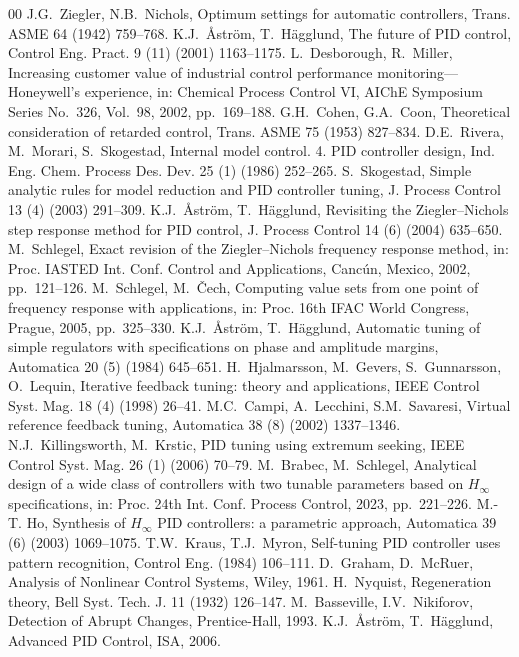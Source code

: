 \documentclass[final,3p,times,twocolumn]{elsarticle}
\begin{document}

\begingroup\scriptsize
\begin{thebibliography}{00}
\setlength{\itemsep}{-0.6pt}\setlength{\parsep}{0pt}
 J.G.~Ziegler, N.B.~Nichols, Optimum settings for
automatic controllers, Trans. ASME 64 (1942) 759--768.
 K.J.~\r{A}str\"om, T.~H\"agglund, The future
of PID control, Control Eng. Pract. 9 (11) (2001) 1163--1175.
 L.~Desborough, R.~Miller, Increasing
customer value of industrial control performance
monitoring---Honeywell's experience, in: Chemical Process Control VI,
AIChE Symposium Series No.~326, Vol.~98, 2002, pp.~169--188.
 G.H.~Cohen, G.A.~Coon, Theoretical consideration
of retarded control, Trans. ASME 75 (1953) 827--834.
 D.E.~Rivera, M.~Morari, S.~Skogestad, Internal
model control. 4. PID controller design, Ind. Eng. Chem. Process Des.
Dev. 25 (1) (1986) 252--265.
 S.~Skogestad, Simple analytic rules for model
reduction and PID controller tuning, J. Process Control 13 (4) (2003)
291--309.
 K.J.~\r{A}str\"om, T.~H\"agglund,
Revisiting the Ziegler--Nichols step response method for PID control,
J. Process Control 14 (6) (2004) 635--650.
 M.~Schlegel, Exact revision of the
Ziegler--Nichols frequency response method, in: Proc. IASTED Int. Conf.
Control and Applications, Canc\'un, Mexico, 2002, pp.~121--126.
 M.~Schlegel, M.~\v{C}ech, Computing value
sets from one point of frequency response with applications, in: Proc.
16th IFAC World Congress, Prague, 2005, pp.~325--330.
 K.J.~\r{A}str\"om, T.~H\"agglund, Automatic
tuning of simple regulators with specifications on phase and amplitude
margins, Automatica 20 (5) (1984) 645--651.
 H.~Hjalmarsson, M.~Gevers, S.~Gunnarsson,
O.~Lequin, Iterative feedback tuning: theory and applications, IEEE
Control Syst. Mag. 18 (4) (1998) 26--41.
 M.C.~Campi, A.~Lecchini, S.M.~Savaresi, Virtual
reference feedback tuning, Automatica 38 (8) (2002) 1337--1346.
 N.J.~Killingsworth, M.~Krstic, PID tuning
using extremum seeking, IEEE Control Syst. Mag. 26 (1) (2006) 70--79.
 M.~Brabec, M.~Schlegel, Analytical design of a
wide class of controllers with two tunable parameters based on $H_\infty$
specifications, in: Proc. 24th Int. Conf. Process Control, 2023, pp.~221--226.
 M.-T. Ho, Synthesis of $H_\infty$ PID controllers: a
parametric approach, Automatica 39 (6) (2003) 1069--1075.
 T.W.~Kraus, T.J.~Myron, Self-tuning PID
controller uses pattern recognition, Control Eng. (1984) 106--111.
 D.~Graham, D.~McRuer, Analysis of
Nonlinear Control Systems, Wiley, 1961.
 H.~Nyquist, Regeneration theory, Bell Syst.
Tech. J. 11 (1932) 126--147.
 M.~Basseville, I.V.~Nikiforov,
Detection of Abrupt Changes, Prentice-Hall, 1993.
 K.J.~\r{A}str\"om, T.~H\"agglund,
Advanced PID Control, ISA, 2006.
\end{thebibliography}
\endgroup
\end{document}
